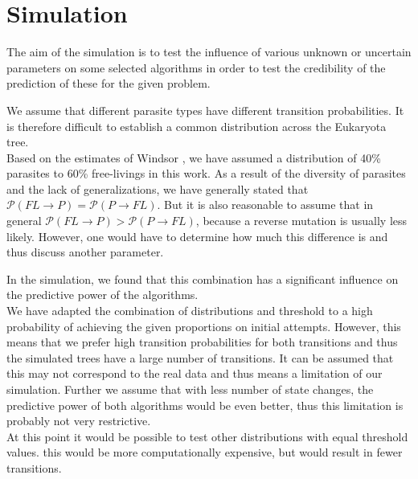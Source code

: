   \section{Simulation} \label{sec:discussion - simulation}
    The aim of the simulation is to test the influence of various unknown or uncertain parameters on 
      some selected algorithms in order to test the credibility of the prediction of these for the 
      given problem.

    We assume that different parasite types have different transition probabilities. It is therefore 
      difficult to establish a common distribution across the Eukaryota tree. \\
    Based on the estimates of Windsor \cite{Windsor1998}, we have assumed a distribution of 40\% 
      parasites to 60\% free-livings in this work. As a result of the diversity of parasites and the 
      lack of generalizations, we have generally stated that 
      $\mathcal{P}(FL \rightarrow P) = \mathcal{P}(P \rightarrow FL)$. But it is also reasonable to 
      assume that in general $\mathcal{P}(FL \rightarrow P) > \mathcal{P}(P \rightarrow FL)$, because 
      a reverse mutation is usually less likely. However, one would have to determine how much this 
      difference is and thus discuss another parameter.
    
    In the simulation, we found that this combination has a significant influence on the predictive 
      power of the algorithms. \\
    We have adapted the combination of distributions and threshold to a high probability of achieving 
      the given proportions on initial attempts. However, this means that we prefer high transition 
      probabilities for both transitions and thus the simulated trees have a large number of 
      transitions. It can be assumed that this may not correspond to the real data and thus means a 
      limitation of our simulation. Further we assume that with less number of state changes, the 
      predictive power of both algorithms would be even better, thus this limitation is probably not 
      very restrictive. \\
    At this point it would be possible to test other distributions with equal threshold values. this 
      would be more computationally expensive, but would result in fewer transitions.

